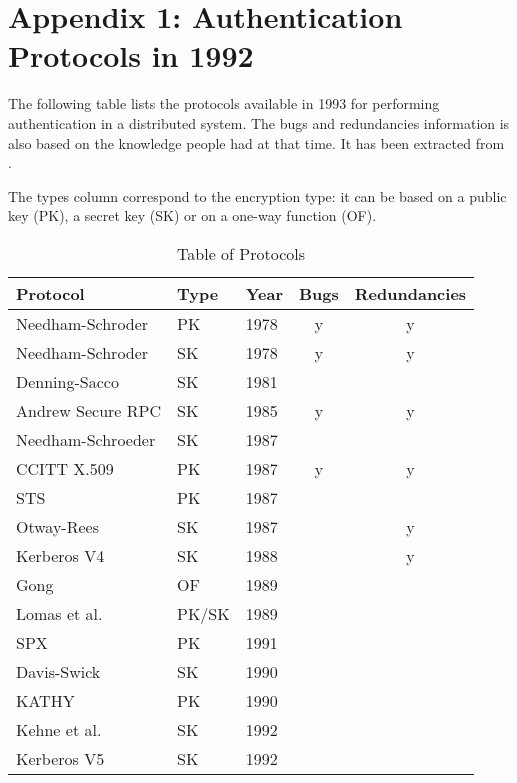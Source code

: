 \chapter{Appendix 1: Authentication Protocols in 1992}
\label{appendix:protocol_list}

The following table lists the protocols available in 1993 for performing authentication in a distributed system. The bugs and redundancies information is also based on the knowledge people had at that time. It has been extracted from \cite{Liebl1993}.

The types column correspond to the encryption type: it can be based on a public key (PK), a secret key (SK) or on a one-way function (OF).
	\begin{table}[!ht]
		\centering
		\caption{Table of Protocols}
		\begin{tabular}{| l | l | l | c | c |}
			\hline
			Protocol & Type & Year & Bugs & Redundancies \\
			\hline
			Needham-Schroder & PK & 1978 & y & y \\
			\hline
			Needham-Schroder & SK & 1978 & y & y \\
			\hline
			Denning-Sacco & SK & 1981 &  &  \\
			\hline
			Andrew Secure RPC & SK & 1985 & y & y \\
			\hline
			Needham-Schroeder & SK & 1987 &  &  \\
			\hline
			CCITT X.509 & PK & 1987 & y & y \\
			\hline
			STS & PK & 1987 &  &  \\
			\hline
			Otway-Rees & SK & 1987 &  & y \\
			\hline
			Kerberos V4 & SK & 1988 &  & y \\
			\hline
			Gong & OF & 1989 &  &  \\
			\hline
			Lomas et al. & PK/SK & 1989 &  &  \\
			\hline
			SPX & PK & 1991 &  &  \\
			\hline
			Davis-Swick & SK & 1990 &  &  \\
			\hline
			KATHY & PK & 1990 &  &  \\
			\hline
			Kehne et al. & SK & 1992 &  &  \\
			\hline
			Kerberos V5 & SK & 1992 &  &  \\
			\hline
		\end{tabular}
	\end{table}
